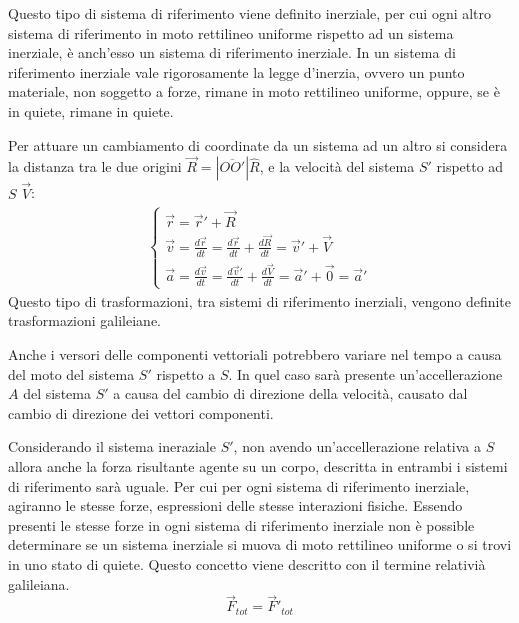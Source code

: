 \documentclass{article}
\numberwithin{equation}{subsection}
\begin{document}
Questo tipo di sistema di riferimento viene definito 
inerziale, per cui ogni altro sistema di riferimento in moto rettilineo uniforme rispetto ad un sistema inerziale, è anch'esso un sistema di riferimento inerziale. 
In un sistema di riferimento inerziale vale rigorosamente la legge d'inerzia, ovvero un punto materiale, non soggetto a forze, rimane in moto rettilineo uniforme, oppure, 
se è in quiete, rimane in quiete. 




Per attuare un 
cambiamento di coordinate da un sistema ad un altro si 
considera la distanza tra le due origini 
$\vec{R}=\left|\overline{OO'}\right|\hat{R}$, e la velocità del 
sistema $S'$ rispetto ad $S$ $\vec{V}$:
\begin{gather}
    \begin{cases}
        \vec{r}=\vec{r}'+\vec{R}\\
        \vec{v}=\displaystyle\frac{d\vec{r}}{dt}=\frac{d\vec{r}}{dt}+\frac{d\vec{R}}{dt}=\vec{v}'+\vec{V}\\
        \vec{a}=\displaystyle\frac{d\vec{v}}{dt}=\frac{d\vec{v}'}{dt}+\frac{d\vec{V}}{dt}=\vec{a}'+\vec{0}=\vec{a}'
    \end{cases}
\end{gather}
Questo tipo di trasformazioni, tra sistemi di riferimento inerziali, vengono definite trasformazioni galileiane. 



Anche i versori delle componenti vettoriali potrebbero variare nel 
tempo a causa del moto del sistema $S'$ rispetto a $S$. In quel 
caso sarà presente un'accellerazione $A$ del sistema $S'$ a 
causa del cambio di direzione della velocità, causato dal cambio 
di direzione dei vettori componenti. 


Considerando il sistema 
ineraziale $S'$, non avendo un'accellerazione relativa a $S$ 
allora anche la forza risultante agente su un corpo, descritta 
in entrambi i sistemi di riferimento sarà uguale. Per cui per ogni sistema di riferimento inerziale, agiranno le stesse forze, espressioni delle stesse interazioni fisiche. 
Essendo presenti le stesse forze in ogni sistema di riferimento inerziale non è possible determinare se un sistema inerziale si muova 
di moto rettilineo uniforme o si trovi in uno stato di quiete. Questo concetto viene descritto con il termine relativià galileiana. 
\begin{equation}
    \vec{F}_{tot}=\vec{F}'_{tot}
\end{equation}
\end{document}
